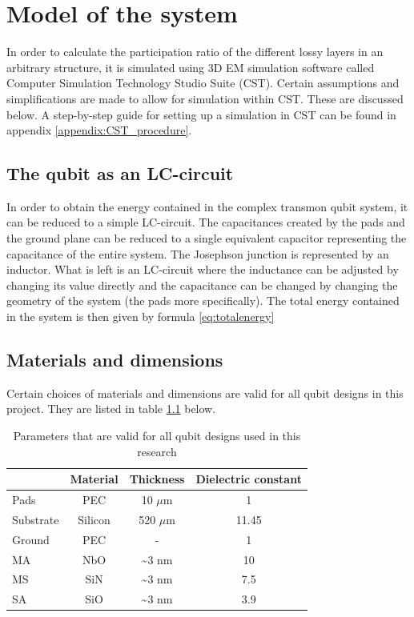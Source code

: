 \chapter{Model of the system}
In order to calculate the participation ratio of the different lossy layers in an arbitrary structure, it is simulated using 3D EM simulation software called Computer Simulation Technology Studio Suite (CST). Certain assumptions and simplifications are made to allow for simulation within CST. These are discussed below. A step-by-step guide for setting up a simulation in CST can be found in appendix \ref{appendix:CST_procedure}.

\section{The qubit as an LC-circuit}
In order to obtain the energy contained in the complex transmon qubit system, it can be reduced to a simple LC-circuit. The capacitances created by the pads and the ground plane can be reduced to a single equivalent capacitor representing the capacitance of the entire system. The Josephson junction is represented by an inductor. What is left is an LC-circuit where the inductance can be adjusted by changing its value directly and the capacitance can be changed by changing the geometry of the system (the pads more specifically). The total energy contained in the system is then given by formula \eqref{eq:totalenergy}

\section{Materials and dimensions}
Certain choices of materials and dimensions are valid for all qubit designs in this project. They are listed in table \ref{table:standard_parameters} below.

\begin{table}
	\begin{center}
		\begin{tabular}{ | l || c | c | c |}
			\hline
			 & Material & Thickness & Dielectric constant \\ \hline
			Pads & PEC & 10 \(\mu\)m & 1 \\
			Substrate & Silicon & 520 \(\mu\)m & 11.45 \\
			Ground & PEC & - & 1 \\
			MA & NbO & \textasciitilde 3 nm & 10 \\
			MS & SiN & \textasciitilde 3 nm & 7.5 \\
			SA & SiO & \textasciitilde 3 nm & 3.9 \\
			\hline
		\end{tabular}
	\end{center}
	\caption{Parameters that are valid for all qubit designs used in this research}
	\label{table:standard_parameters}
\end{table}


